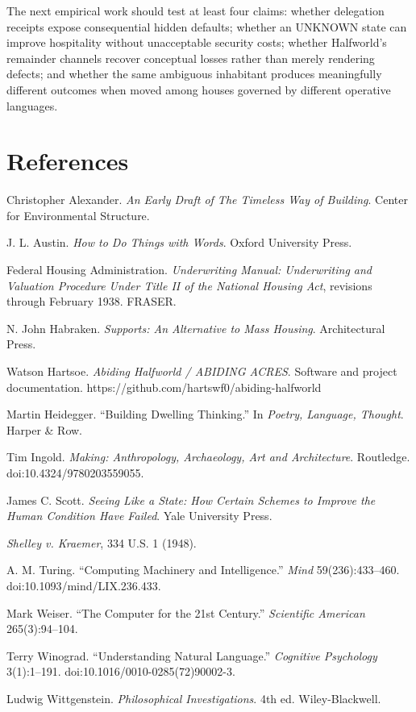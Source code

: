 \documentclass[11pt]{article}
\begin{document}
The next empirical work should test at least four claims: whether delegation receipts expose consequential hidden defaults; whether an UNKNOWN state can improve hospitality without unacceptable security costs; whether Halfworld's remainder channels recover conceptual losses rather than merely rendering defects; and whether the same ambiguous inhabitant produces meaningfully different outcomes when moved among houses governed by different operative languages.

\section*{References}
\begin{description}[style=multiline,leftmargin=2.8cm,labelwidth=2.5cm]
\item[Alexander 1970] Christopher Alexander. \emph{An Early Draft of The Timeless Way of Building}. Center for Environmental Structure.
\item[Austin 1962] J. L. Austin. \emph{How to Do Things with Words}. Oxford University Press.
\item[FHA 1938] Federal Housing Administration. \emph{Underwriting Manual: Underwriting and Valuation Procedure Under Title II of the National Housing Act}, revisions through February 1938. FRASER.
\item[Habraken 1972] N. John Habraken. \emph{Supports: An Alternative to Mass Housing}. Architectural Press.
\item[Hartsoe 2026] Watson Hartsoe. \emph{Abiding Halfworld / ABIDING ACRES}. Software and project documentation. https://github.com/hartswf0/abiding-halfworld
\item[Heidegger 1971] Martin Heidegger. ``Building Dwelling Thinking.'' In \emph{Poetry, Language, Thought}. Harper \& Row.
\item[Ingold 2013] Tim Ingold. \emph{Making: Anthropology, Archaeology, Art and Architecture}. Routledge. doi:10.4324/9780203559055.
\item[Scott 1998] James C. Scott. \emph{Seeing Like a State: How Certain Schemes to Improve the Human Condition Have Failed}. Yale University Press.
\item[Shelley 1948] \emph{Shelley v. Kraemer}, 334 U.S. 1 (1948).
\item[Turing 1950] A. M. Turing. ``Computing Machinery and Intelligence.'' \emph{Mind} 59(236):433--460. doi:10.1093/mind/LIX.236.433.
\item[Weiser 1991] Mark Weiser. ``The Computer for the 21st Century.'' \emph{Scientific American} 265(3):94--104.
\item[Winograd 1972] Terry Winograd. ``Understanding Natural Language.'' \emph{Cognitive Psychology} 3(1):1--191. doi:10.1016/0010-0285(72)90002-3.
\item[Wittgenstein 2009] Ludwig Wittgenstein. \emph{Philosophical Investigations}. 4th ed. Wiley-Blackwell.
\end{description}
\end{document}
